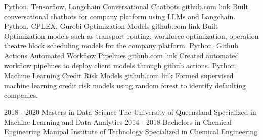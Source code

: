 \documentclass[9pt]{developercv} %
\begin{document}
\begin{entrylist}
    \entry
		{Python, Tensorflow, Langchain} %
		{Conversational Chatbots} %
		{github.com link} %
		{%
        Built conversational chatbots for company platform using LLMs and Langchain.} %
    \entry
		{Python, CPLEX, Gurobi}
		{Optimization Models}
		{github.com link}
		{%
        Built Optimization models such as transport routing, workforce optimization, operation theatre block scheduling models for the company platform.}
	\entry
		{Python, Github Actions}
		{Automated Workflow Pipelines}
		{github.com link}
		{%
        Created automated workflow pipelines to deploy client models through github actions.}
    \entry
		{Python, Machine Learning}
		{Credit Risk Models}
		{github.com link}
		{%
        Formed supervised machine learning credit risk models using random forest to identify defaulting companies.}
\end{entrylist}

\vspace{-10 pt}
\begin{entrylist}
    \entry
		{2018 - 2020} %
		{Masters in Data Science} %
		{The University of Queensland} %
		{Specialized in Machine Learning and Data Analytics} %
    \entry
		{2014 - 2018}
		{Bachelors in Chemical Engineering}
		{Manipal Institute of Technology}
		{Specialized in Chemical Engineering}
\end{entrylist}
\end{document}
